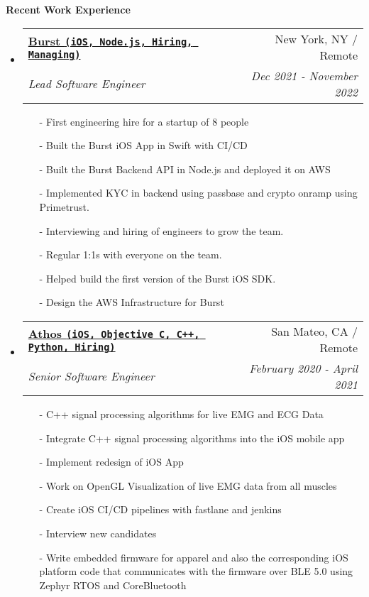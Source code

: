 \documentclass[letterpaper,11pt]{article}
\makeatletter
\newcommand{\resheading}[1]{{\large \colorbox{mygrey}{\begin{minipage}{\textwidth}{\textbf{#1 \vphantom{p\^{E}}}}\end{minipage}}}}
\newcommand{\ressubheading}[4]{
\begin{tabular*}{7.0in}{l@{\extracolsep{\fill}}r}
    \textbf{#1} & #2 \\
    \textit{#3} & \textit{#4} \\
\end{tabular*}\vspace{-6pt}}
\makeatother
\begin{document}
\resheading{Recent Work Experience}
\begin{itemize}

\item
    \ressubheading{\href{https://www.joinburst.com}{Burst \texttt{(iOS, Node.js, Hiring, Managing)}}}{New York, NY / Remote}{Lead Software Engineer}{Dec 2021 - November 2022 }
    \begin{itemize}
        \item[-]{First engineering hire for a startup of 8 people}
        \item[-]{Built the Burst iOS App in Swift with CI/CD}
        \item[-]{Built the Burst Backend API in Node.js and deployed it on AWS}
        \item[-]{Implemented KYC in backend using passbase and crypto onramp using Primetrust.}
        \item[-]{Interviewing and hiring of engineers to grow the team.}
        \item[-]{Regular 1:1s with everyone on the team.}
        \item[-]{Helped build the first version of the Burst iOS SDK.}
        \item[-]{Design the AWS Infrastructure for Burst}
    \end{itemize}


\item
    \ressubheading{\href{https://www.crunchbase.com/organization/athos}{Athos \texttt{(iOS, Objective C, C++, Python, Hiring)}}}{San Mateo, CA / Remote}{Senior Software Engineer}{February 2020 - April 2021}
    \begin{itemize}
        \item[-]{C++ signal processing algorithms for live EMG and ECG Data}
        \item[-]{Integrate C++ signal processing algorithms into the iOS mobile app}
        \item[-]{Implement redesign of iOS App}
        \item[-]{Work on OpenGL Visualization of live EMG data from all muscles}
        \item[-]{Create iOS CI/CD pipelines with fastlane and jenkins}
        \item[-]{Interview new candidates}
        \item[-]{Write embedded firmware for apparel and also the corresponding iOS platform code that communicates with the firmware over BLE 5.0 using Zephyr RTOS and CoreBluetooth}
    \end{itemize}




\end{itemize}
\end{document}
